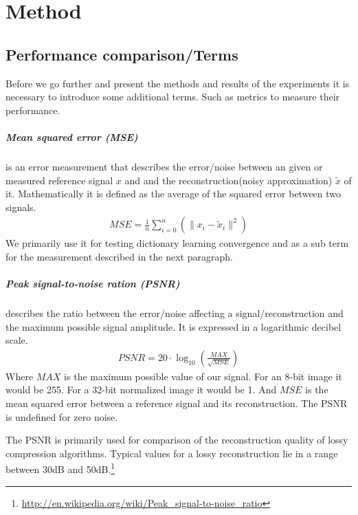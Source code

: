 \chapter{Method}

\section{Performance comparison/Terms}
Before we go further and present the methods and results of the experiments
it is necessary to introduce some additional terms. Such as metrics to measure
their performance.

\paragraph{Mean squared error (MSE)} is an error measurement that
describes the error/noise between an given or measured reference signal $x$
and  and the reconstruction(noisy approximation) $\tilde{x}$ of it.
Mathematically it is defined as the average of the squared error between two
signals.
\begin{align}
 MSE = \frac{1}{n} \sum_{i=0}^{n} \left( {\lVert x_i -
\tilde{x}_i\rVert^{2}}\right)
\end{align}
We primarily use it for testing dictionary learning convergence and as a
sub term for the measurement described in the next paragraph.

\paragraph{Peak signal-to-noise ration (PSNR)} describes the ratio between the
error/noise affecting a signal/reconstruction and the maximum possible signal
amplitude. It is expressed in a logarithmic decibel scale.
\begin{align}
 PSNR = 20 \cdot \log_{10} \left(\frac{MAX}{\sqrt{MSE}}\right)
\end{align}
Where $MAX$ is the maximum possible value of our signal. For an 8-bit
image it would be 255. For a 32-bit normalized image it would be 1. And $MSE$ is
the mean squared error between a reference signal and its reconstruction. The
PSNR is undefined for zero noise.

The PSNR is primarily used for comparison of the reconstruction quality of
lossy compression algorithms. Typical values for a lossy reconstruction lie in
a range between 30dB and
50dB.\footnote{\url{http://en.wikipedia.org/wiki/Peak_signal-to-noise_ratio}}


